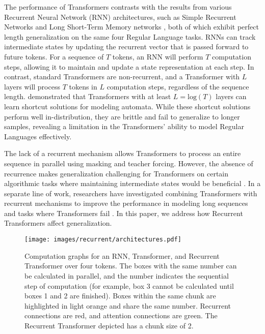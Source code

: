     The performance of Transformers contrasts with the results from various Recurrent Neural Network (RNN) architectures, such as Simple Recurrent Networks \citep{elman_finding_1990} and Long Short-Term Memory networks \citep{hochreiter_long_1997}, both of which exhibit perfect length generalization on the same four Regular Language tasks. RNNs can track intermediate states by updating the recurrent vector that is passed forward to future tokens. For a sequence of $T$ tokens, an RNN will perform $T$ computation steps, allowing it to maintain and update a state representation at each step. In contrast, standard Transformers are non-recurrent, and a Transformer with $L$ layers will process $T$ tokens in $L$ computation steps, regardless of the sequence length. \citet{liu_transformers_2022} demonstrated that Transformers with at least $L=\text{log}(T)$ layers can learn shortcut solutions for modeling automata. While these shortcut solutions perform well in-distribution, they are brittle and fail to generalize to longer samples, revealing a limitation in the Transformers' ability to model Regular Languages effectively.
    
    The lack of a recurrent mechanism allows Transformers to process an entire sequence in parallel using masking and teacher forcing. However, the absence of recurrence makes generalization challenging for Transformers on certain algorithmic tasks where maintaining intermediate states would be beneficial \citep{merrill_parallelism_2023}. In a separate line of work, researchers have investigated combining Transformers with recurrent mechanisms to improve the performance in modeling long sequences \citep{hutchins_block-recurrent_2022, ding_ernie-doc_2021, bulatov_recurrent_2022} and tasks where Transformers fail \citep{ju_staircase_2022}. In this paper, we address how Recurrent Transformers affect generalization.
    
    \begin{figure}
        \centering    \texttt{[image: images/recurrent/architectures.pdf]}
        \caption{Computation graphs for an RNN, Transformer, and Recurrent Transformer over four tokens. The boxes with the same number can be calculated in parallel, and the number indicates the sequential step of computation (for example, box 3 cannot be calculated until boxes 1 and 2 are finished). Boxes within the same chunk are highlighted in light orange and share the same number. Recurrent connections are red, and attention connections are green. The Recurrent Transformer depicted has a chunk size of 2.}
        \label{fig:architectures}
    \end{figure}
    
